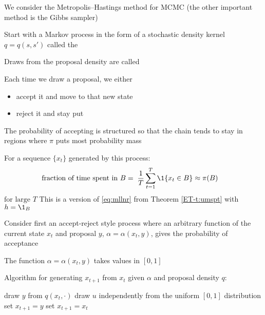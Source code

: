 \begin{frame}

    \vspace{2em}
    We consider the Metropolis--Hastings method for MCMC (the other important method is 
    the Gibbs sampler)

    Start with a Markov process in the form of
    a stochastic density kernel $q = q(s, s')$ called the
    
    Draws from the proposal density are called
    
    Each time we draw a proposal, we
    either 
    \begin{itemize}
        \item accept it and move to that new state
        \item reject it and stay put
    \end{itemize}
    
    The probability of accepting is structured so that the chain tends to stay in regions
    where $\pi$ puts most probability mass
    
\end{frame}
    
\begin{frame}

    \vspace{2em}
    For a sequence
    $\{x_t\}$ generated by this process:
    \begin{equation*}
        \text{fraction of time spent in $B = $}
        \;\;
        \frac{1}{T} \sum_{t=1}^T \1\{x_t \in B\} \approx \pi(B)
        \quad 
    \end{equation*}
    $\text{for large } T$
    This is a version of \eqref{eq:mllnr} from Theorem \ref{ET-t:umspt} with $h = \1_B$
    
\end{frame}
    
\begin{frame}

    \vspace{2em}
    Consider first an accept-reject style process where an arbitrary function of the
    current state $x_t$ and proposal $y$, $\alpha = \alpha(x_t, y)$, gives the
    probability of acceptance
    
    The function $\alpha = \alpha(x_t, y)$ takes values in $[0, 1]$
    
    Algorithm for generating $x_{t+1}$ from $x_t$ given $\alpha$ and proposal density $q$:

    \vspace{0.6em}
    \begin{algorithmic}[1]
        \State draw $y$ from $q(x_t, \cdot)$
        \State draw $u$ independently from the uniform $[0, 1]$ distribution
          
        \State set $x_{t+1} = y$
        \Else {}
        \State set $x_{t+1} = x_t$
        \EndIf
    \end{algorithmic}
    
\end{frame}

